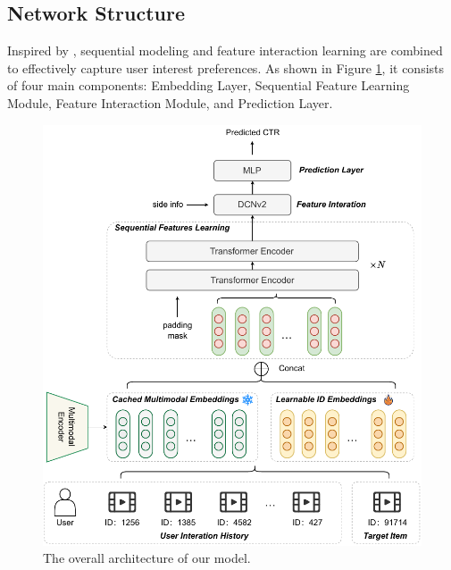 \documentclass[sigconf, nonacm, screen]{acmart}
\begin{document}
\subsection{Network Structure}
Inspired by \cite{TransAct}, sequential modeling and feature interaction learning are combined to effectively capture user interest preferences.
As shown in Figure \ref{fig:network}, it consists of four main components: Embedding Layer, Sequential Feature Learning Module, Feature Interaction Module, and Prediction Layer.

\begin{figure}[htbp]
  \vspace{-1mm}
  \centering
  \includegraphics[width=\linewidth]{assets/MMCTR.pdf}
  \caption{The overall architecture of our model.}
  \label{fig:network}
  \vspace{-2mm}
\end{figure}
\end{document}
